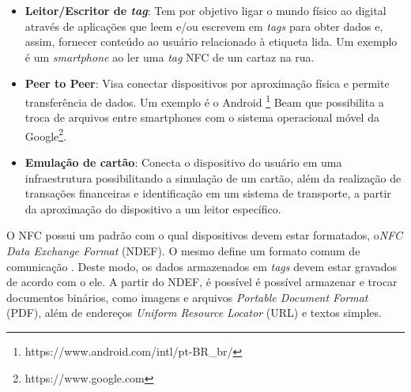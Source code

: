 \begin{itemize} \parskip -1pt
	\item \textbf{Leitor/Escritor de \textit{tag}}: Tem por objetivo ligar o mundo físico ao digital através de aplicações que leem e/ou escrevem em \textit{tags} para obter dados e, assim, fornecer conteúdo ao usuário relacionado à etiqueta lida. Um exemplo é um \textit{smartphone} ao ler uma \textit{tag} NFC de um cartaz na rua.
	\item \textbf{Peer to Peer}: Visa conectar dispositivos por aproximação física e permite transferência de dados. Um exemplo é o Android \textsuperscript{\textregistered}\footnote{https://www.android.com/intl/pt-BR\_br/} Beam que possibilita a troca de arquivos entre smartphones com o 
	sistema operacional móvel da Google\textsuperscript{\textregistered}\footnote{https://www.google.com}.
	\item \textbf{Emulação de cartão}: Conecta o dispositivo do usuário em uma infraestrutura possibilitando a simulação de um cartão, além da realização de transações financeiras e identificação em um sistema de transporte, a partir da aproximação do dispositivo a um leitor 	específico.
\end{itemize}



O NFC possui um padrão com o qual dispositivos devem estar formatados, o\textit{NFC Data Exchange Format} (NDEF). O mesmo define um formato comum de comunicação \cite{Igoe2014}. Deste modo, os dados armazenados em \textit{tags} devem estar gravados de acordo com o ele. A partir do NDEF, é possível é possível armazenar e trocar documentos binários, como imagens e arquivos \textit{Portable Document Format} (PDF), além de endereços \textit{Uniform Resource Locator} (URL) e textos simples.


